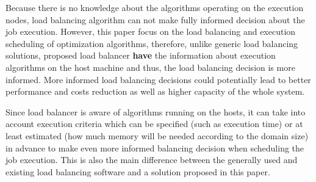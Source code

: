 Because there is no knowledge about the algorithms operating on the execution nodes,
load balancing algorithm can not make fully informed decision about the job execution.
However, this paper focus on the load balancing and execution scheduling of optimization algorithms,
therefore,
unlike generic load balancing solutions,
proposed load balancer \textbf{have} the information about execution algorithms on the host machine
and thus, the load balancing decision is more informed.
More informed load balancing decisions could potentially lead to better performance and costs reduction as well as higher capacity of the whole system.

Since load balancer is aware of algorithms running on the hosts,
it can take into account execution criteria which can be specified (such as execution time)
or at least estimated (how much memory will be needed according to the domain size) in advance to make even more informed balancing decision
when scheduling the job execution.
This is also the main difference between the generally used and existing load balancing software and a solution proposed in this paper.